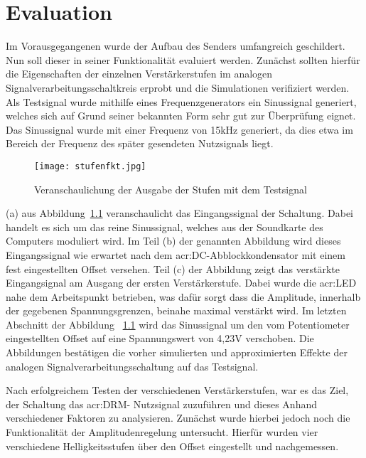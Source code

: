 
\chapter{Evaluation}
\label{sec:evaluation}
Im Vorausgegangenen wurde der Aufbau des Senders umfangreich geschildert. Nun soll dieser in seiner Funktionalität evaluiert werden. Zunächst sollten hierfür die Eigenschaften der einzelnen Verstärkerstufen im analogen Signalverarbeitungsschaltkreis erprobt und die Simulationen verifiziert werden. Als Testsignal wurde mithilfe eines Frequenzgenerators ein Sinussignal generiert, welches sich auf Grund seiner bekannten Form sehr gut zur Überprüfung eignet. Das Sinussignal wurde mit einer Frequenz von 15kHz generiert, da dies etwa im Bereich der Frequenz des später gesendeten Nutzsignals liegt. 


\begin{figure}[h]
	\centering
	\texttt{[image: stufenfkt.jpg]}
	\caption[Veranschaulichung der Ausgabe der Stufen mit dem Testsignal]{Veranschaulichung der Ausgabe der Stufen mit dem Testsignal}
	\label{fig:stufeneva}
\end{figure}

(a) aus Abbildung~\ref{fig:stufeneva} veranschaulicht das Eingangssignal der Schaltung. Dabei handelt es sich um das reine Sinussignal, welches aus der Soundkarte des Computers moduliert wird. Im Teil (b) der genannten Abbildung wird dieses Eingangssignal wie erwartet nach dem \gls{acr:DC}-Abblockkondensator mit einem fest eingestellten Offset versehen. Teil (c) der Abbildung zeigt das verstärkte Eingangsignal am Ausgang der ersten Verstärkerstufe. Dabei wurde die \gls{acr:LED} nahe dem Arbeitspunkt betrieben, was dafür sorgt dass die Amplitude, innerhalb der gegebenen Spannungsgrenzen, beinahe maximal verstärkt wird. Im letzten Abschnitt der Abbildung ~\ref{fig:stufeneva} wird das Sinussignal um den vom Potentiometer eingestellten Offset auf eine Spannungswert von 4,23V verschoben. Die Abbildungen bestätigen die vorher simulierten und approximierten Effekte der analogen Signalverarbeitungsschaltung auf das Testsignal. 


Nach erfolgreichem Testen der verschiedenen Verstärkerstufen, war es das Ziel, der Schaltung das \gls{acr:DRM}- Nutzsignal zuzuführen und dieses Anhand verschiedener Faktoren zu analysieren. Zunächst wurde hierbei jedoch noch die Funktionalität der Amplitudenregelung untersucht. Hierfür wurden vier verschiedene Helligkeitsstufen über den Offset eingestellt und nachgemessen.

